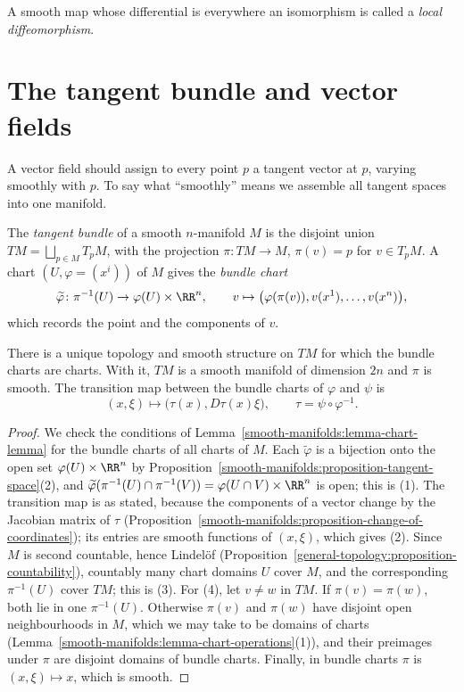 A smooth map whose differential is everywhere an isomorphism is called a \emph{local diffeomorphism}.

\section{The tangent bundle and vector fields}\label{smooth-manifolds:section-vector-fields}

A vector field should assign to every point $p$ a tangent vector at $p$, varying smoothly with $p$. To say what ``smoothly'' means we assemble all tangent
spaces into one manifold.

\begin{definition}\label{smooth-manifolds:definition-tangent-bundle}
The \emph{tangent bundle} of a smooth $n$-manifold $M$ is the disjoint union $TM = \bigsqcup_{p \in M}T_pM$, with the projection $\pi \colon TM \to M$,
$\pi(v) = p$ for $v \in T_pM$. A chart $(U, \varphi = (x^i))$ of $M$ gives the \emph{bundle chart}
\[
\widetilde{\varphi} \colon \pi^{-1}(U) \to \varphi(U) \times \RR^n, \qquad v \mapsto \bigl(\varphi(\pi(v)), v(x^1), \ldots, v(x^n)\bigr),
\]
which records the point and the components of $v$.
\end{definition}

\begin{proposition}\label{smooth-manifolds:proposition-tangent-bundle}
There is a unique topology and smooth structure on $TM$ for which the bundle charts are charts. With it, $TM$ is a smooth manifold of dimension $2n$ and
$\pi$ is smooth. The transition map between the bundle charts of $\varphi$ and $\psi$ is
\[
(x, \xi) \mapsto \bigl(\tau(x), D\tau(x)\xi\bigr), \qquad \tau = \psi \circ \varphi^{-1}.
\]
\end{proposition}

\begin{proof}
We check the conditions of Lemma~\ref{smooth-manifolds:lemma-chart-lemma} for the bundle charts of all charts of $M$. Each $\widetilde{\varphi}$ is a
bijection onto the open set $\varphi(U) \times \RR^n$ by Proposition~\ref{smooth-manifolds:proposition-tangent-space}(2), and
$\widetilde{\varphi}(\pi^{-1}(U) \cap \pi^{-1}(V)) = \varphi(U \cap V) \times \RR^n$ is open; this is (1). The transition map is as stated, because the components
of a vector change by the Jacobian matrix of $\tau$ (Proposition~\ref{smooth-manifolds:proposition-change-of-coordinates}); its entries are smooth functions of
$(x, \xi)$, which gives (2). Since $M$ is second countable, hence Lindel\"of (Proposition~\ref{general-topology:proposition-countability}), countably many chart
domains $U$ cover $M$, and the corresponding $\pi^{-1}(U)$ cover $TM$; this is (3). For (4), let $v \neq w$ in $TM$. If $\pi(v) = \pi(w)$, both lie in one
$\pi^{-1}(U)$. Otherwise $\pi(v)$ and $\pi(w)$ have disjoint open neighbourhoods in $M$, which we may take to be domains of charts
(Lemma~\ref{smooth-manifolds:lemma-chart-operations}(1)), and their preimages under $\pi$ are disjoint domains of bundle charts. Finally, in bundle charts
$\pi$ is $(x, \xi) \mapsto x$, which is smooth.
\end{proof}

